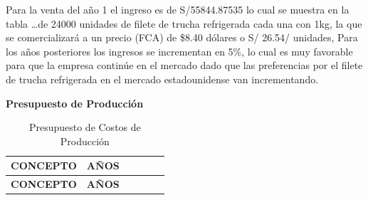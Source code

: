 \documentclass[
  stu,
  floatsintext,
  longtable,
  a4paper,
  nolmodern,
  notxfonts,
  notimes,
  colorlinks=true,linkcolor=blue,citecolor=blue,urlcolor=blue]{apa7}
\begin{document}
Para la venta del año 1 el ingreso es de S/55844.87535 lo cual se
muestra en la tabla \ldots de 24000 unidades de filete de trucha
refrigerada cada una con 1kg, la que se comercializará a un precio (FCA)
de \$8.40 dólares o S/ 26.54/ unidades, Para los años posteriores los
ingresos se incrementan en 5\%, lo cual es muy favorable para que la
empresa continúe en el mercado dado que las preferencias por el filete
de trucha refrigerada en el mercado estadounidense van incrementando.

\textbf{Presupuesto de Producción}

\begin{longtable}[]{@{}
  >{\raggedright\arraybackslash}p{}
  >{\centering\arraybackslash}p{}
  >{\centering\arraybackslash}p{}
  >{\centering\arraybackslash}p{}
  >{\centering\arraybackslash}p{}
  >{\centering\arraybackslash}p{}@{}}
\caption{Presupuesto de Costos de Producción}\tabularnewline
\toprule\noalign{}
\begin{minipage}[b]{\linewidth}\raggedright
\textbf{CONCEPTO}
\end{minipage} & \begin{minipage}[b]{\linewidth}\centering
\textbf{AÑOS}
\end{minipage} & \begin{minipage}[b]{\linewidth}\centering
\end{minipage} & \begin{minipage}[b]{\linewidth}\centering
\end{minipage} & \begin{minipage}[b]{\linewidth}\centering
\end{minipage} & \begin{minipage}[b]{\linewidth}\centering
\end{minipage} \\
\midrule\noalign{}
\endfirsthead
\toprule\noalign{}
\begin{minipage}[b]{\linewidth}\raggedright
\textbf{CONCEPTO}
\end{minipage} & \begin{minipage}[b]{\linewidth}\centering
\textbf{AÑOS}
\end{minipage} & \begin{minipage}[b]{\linewidth}\centering
\end{minipage} & \begin{minipage}[b]{\linewidth}\centering

\end{minipage}
\end{longtable}
\end{document}
